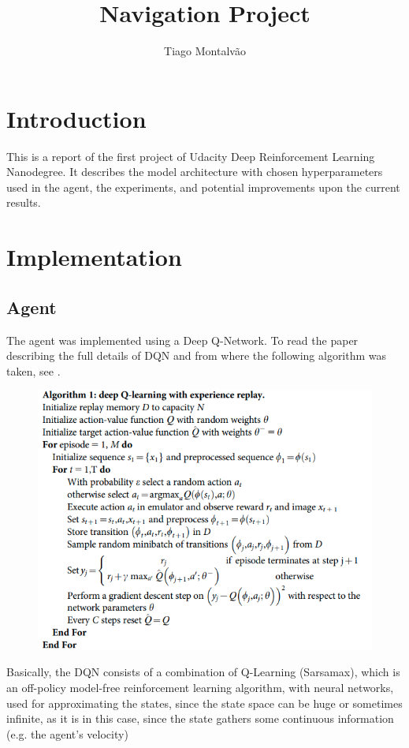 \documentclass{article}
\title{Navigation Project}
\author{Tiago Montalvão}
\begin{document}
\maketitle
\justify

\section{Introduction}

This is a report of the first project of Udacity Deep Reinforcement Learning Nanodegree. It describes the model architecture with chosen hyperparameters used in the agent, the experiments, and potential improvements upon the current results.

\section{Implementation}
\subsection{Agent}

The agent was implemented using a Deep Q-Network. To read the paper describing the full details of DQN and from where the following algorithm was taken, see \cite{Mnih2015}.

\begin{figure}[H]
\centering
\includegraphics[scale=0.5]{img/DQN.png}
\label{fig:dqn}
\end{figure}

Basically, the DQN consists of a combination of Q-Learning (Sarsamax), which is an off-policy model-free reinforcement learning algorithm, with neural networks, used for approximating the states, since the state space can be huge or sometimes infinite, as it is in this case, since the state gathers some continuous information (e.g. the agent's velocity) 
\end{document}
